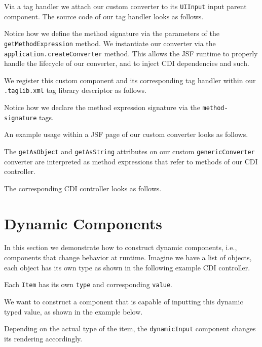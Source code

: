 Via a tag handler we attach our custom converter to its \texttt{UIInput} input parent component.
The source code of our tag handler looks as follows.

Notice how we define the method signature via the parameters of the \texttt{getMethodExpression} method.
We instantiate our converter via the \texttt{application.createConverter} method.
This allows the JSF runtime to properly handle the lifecycle of our converter, and to inject CDI dependencies and such.

We register this custom component and its corresponding tag handler within our \texttt{.taglib.xml} tag library descriptor as follows.

Notice how we declare the method expression signature via the \texttt{method-signature} tags.

An example usage within a JSF page of our custom converter looks as follows.

The \texttt{getAsObject} and \texttt{getAsString} attributes on our custom \texttt{genericConverter} converter are interpreted as method expressions that refer to methods of our CDI controller.

The corresponding CDI controller looks as follows.



\section{Dynamic Components}
\label{sec:dynamic-components}
In this section we demonstrate how to construct dynamic components, i.e., components that change behavior at runtime.
Imagine we have a list of objects, each object has its own type as shown in the following example CDI controller.

Each \texttt{Item} has its own \texttt{type} and corresponding \texttt{value}.

We want to construct a component that is capable of inputting this dynamic typed value, as shown in the example below.

Depending on the actual type of the item, the \texttt{dynamicInput} component changes its rendering accordingly.

